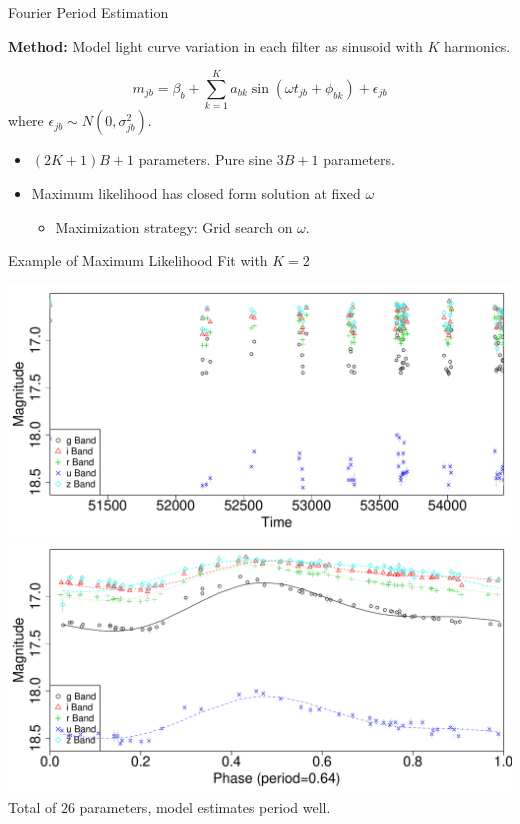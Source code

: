 \documentclass[12pt]{beamer}
\begin{document}
\begin{frame}{Fourier Period Estimation}

\textbf{Method:} Model light curve variation in each filter as sinusoid with $K$ harmonics. \cite{mondrik2015multiband,zechmeister2009generalised,lomb1976least,scargle1982studies,schwarzenberg1996fast}

\begin{equation*}
m_{jb} = \beta_b + \sum_{k=1}^K a_{bk}\sin(\omega t_{jb} + \phi_{bk}) + \epsilon_{jb}
\end{equation*}
where $\epsilon_{jb} \sim N(0,\sigma_{jb}^2)$.

\begin{itemize}
\item $(2K + 1)B + 1$ parameters. Pure sine $3B + 1$ parameters.
\item Maximum likelihood has closed form solution at fixed $\omega$
\begin{itemize}
\item Maximization strategy: Grid search on $\omega$.
\end{itemize}
\end{itemize}

\end{frame}


\begin{frame}{Example of Maximum Likelihood Fit with $K=2$}

\vspace{-.1in}

\begin{center}
\includegraphics[scale=.25]{figs/rrlyrae_nomodel_fit.pdf}\\
\includegraphics[scale=.25]{figs/rrlyrae_model_fit.pdf}\\
Total of $26$ parameters, model estimates period well.
\end{center}

\end{frame}
\end{document}
